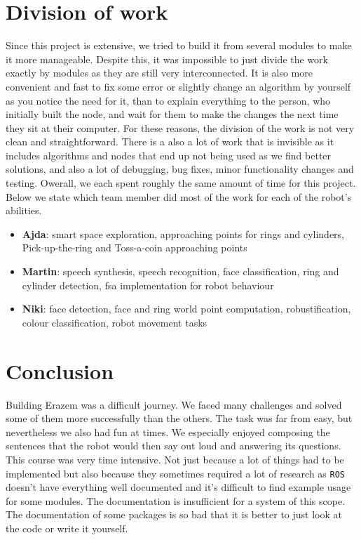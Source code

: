 \documentclass[12pt,a4paper]{article}
\begin{document}
	\section{Division of work}
	Since this project is extensive, we tried to build it from several modules to make it more manageable. Despite this, it was impossible to just divide the work exactly by modules as they are still very interconnected. It is also more convenient and fast to fix some error or slightly change an algorithm by yourself as you notice the need for it, than to explain everything to the person, who initially built the node, and wait for them to make the changes the next time they sit at their computer. For these reasons, the division of the work is not very clean and straightforward. There is a also a lot of work that is invisible as it includes algorithms and nodes that end up not being used as we find better solutions, and also a lot of debugging, bug fixes, minor functionality changes and testing. Owerall, we each spent roughly the same amount of time for this project. Below we state which team member did most of the work for each of the robot's abilities. \\
	
	\begin{itemize}
		\item \textbf{Ajda}: smart space exploration, approaching points for rings and cylinders, Pick-up-the-ring and Toss-a-coin approaching points
		\item \textbf{Martin}: speech synthesis, speech recognition, face classification, ring and cylinder detection, fsa implementation for robot behaviour
		\item \textbf{Niki}: face detection, face and ring world point computation, robustification, colour classification, robot movement tasks 
	\end{itemize}
	
	\section{Conclusion}
	Building Erazem was a difficult journey. We faced many challenges and solved some of them more successfully than the others. The task was far from easy, but nevertheless we also had fun at times. We especially enjoyed composing the sentences that the robot would then say out loud and answering its questions. \\

	This course was very time intensive. Not just because a lot of things had to be implemented but also because they sometimes required a lot of research as \texttt{ROS} doesn't have everything well documented and it's difficult to find example usage for some modules. The documentation is insufficient for a system of this scope. The documentation of some packages is so bad that it is better to just look at the code or write it yourself. \\
\end{document}
